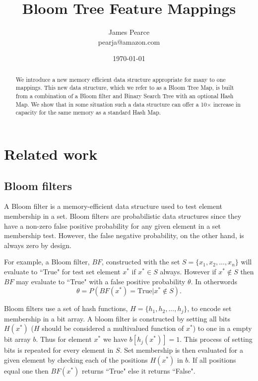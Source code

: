 \documentclass[12pt]{article}
\title{Bloom Tree Feature Mappings}
\author{ James Pearce \\
	     pearja@amazon.com\\
	      }
\date{\today}
\begin{document}
\maketitle


\begin{abstract}
We introduce a new memory efficient data structure appropriate for many to one mappings. This new data structure, which we refer to as a Bloom Tree Map, is built from a combination of a Bloom filter and Binary Search Tree with an optional Hash Map. We show that in some situation such a data structure can offer a 10$\times$ increase in capacity for the same memory as a standard Hash Map.  
\end{abstract}

\section*{Related work}

\subsection*{Bloom filters}
A Bloom filter is a memory-efficient data structure used to test element membership in a set. Bloom filters are probabilistic data structures since they have a non-zero false positive probability for any given element in a set membership test. However, the false negative probability, on the other hand, is always zero by design. 

For example, a Bloom filter, $BF$, constructed with the set $S = \{x_1, x_2, ..., x_n\}$ will evaluate to ``True" for test set element $x^*$ if $x^*\in S$ always. However if  $x^* \notin S$ then $BF$ may evaluate to ``True" with a false positive probability $\theta$. In otherwords
\begin{equation} \label{eq:0}
\theta = P(BF(x^*) = \mathrm{True} | x^* \notin S).
\end{equation}

Bloom filters use a set of hash functions, $H = \{h_1, h_2, ..., h_j\}$, to encode set membership in a bit array. A bloom filter is constructed by setting all bits $H(x^*)$ ($H$ should be considered a multivalued function of $x^*$) to one in a empty bit array $b$. Thus for element $x^*$ we have $b[h_j(x^*)] = 1$. This process of setting bits is repeated for every element in $S$. Set membership is then evaluated for a given element by checking each of the positions $H(x^*)$ in $b$. If all positions equal one then $BF(x^*)$ returns ``True" else it returns ``False". 
\end{document}
